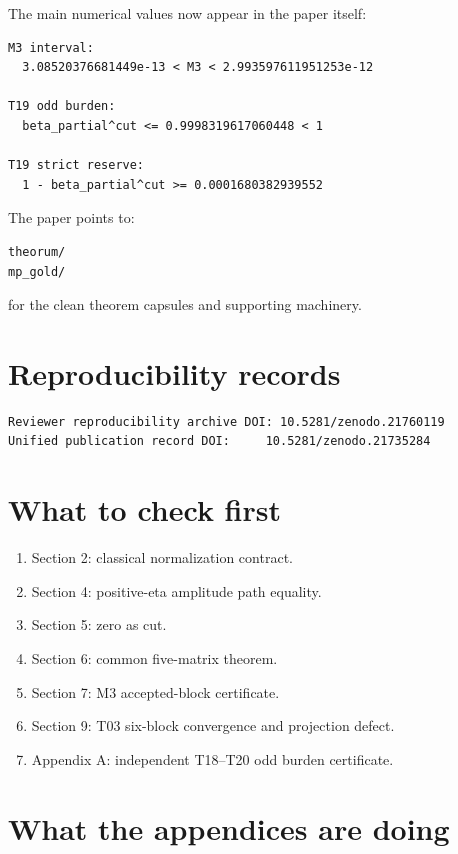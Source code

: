 The main numerical values now appear in the paper itself:

\begin{verbatim}
M3 interval:
  3.08520376681449e-13 < M3 < 2.993597611951253e-12

T19 odd burden:
  beta_partial^cut <= 0.9998319617060448 < 1

T19 strict reserve:
  1 - beta_partial^cut >= 0.0001680382939552
\end{verbatim}

The paper points to:

\begin{verbatim}
theorum/
mp_gold/
\end{verbatim}

for the clean theorem capsules and supporting machinery.

\hypertarget{reproducibility-records}{%
\section{Reproducibility records}\label{reproducibility-records}}

\begin{verbatim}
Reviewer reproducibility archive DOI: 10.5281/zenodo.21760119
Unified publication record DOI:     10.5281/zenodo.21735284
\end{verbatim}

\hypertarget{what-to-check-first}{%
\section{What to check first}\label{what-to-check-first}}

\begin{enumerate}
\def\labelenumi{\arabic{enumi}.}
\tightlist
\item
  Section 2: classical normalization contract.
\item
  Section 4: positive-eta amplitude path equality.
\item
  Section 5: zero as cut.
\item
  Section 6: common five-matrix theorem.
\item
  Section 7: M3 accepted-block certificate.
\item
  Section 9: T03 six-block convergence and projection defect.
\item
  Appendix A: independent T18--T20 odd burden certificate.
\end{enumerate}

\hypertarget{what-the-appendices-are-doing}{%
\section{What the appendices are doing}\label{what-the-appendices-are-doing}}

